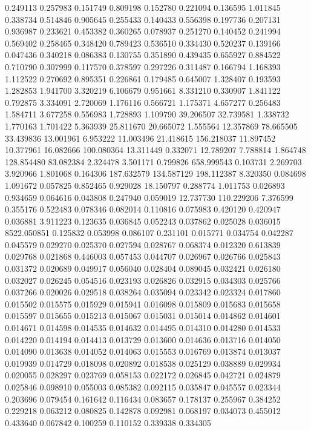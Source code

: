 0.249113
0.257983
0.151749
0.809198
0.152780
0.221094
0.136595
1.011845
0.338734
0.514846
0.905645
0.255433
0.140433
0.556398
0.197736
0.207131
0.936987
0.233621
0.453382
0.360265
0.078937
0.251270
0.140452
0.241994
0.569402
0.258465
0.348420
0.789423
0.536510
0.334430
0.520237
0.139166
0.047436
0.340218
0.086383
0.130755
0.351890
0.439435
0.655927
0.884522
0.710790
0.307999
0.117570
0.378597
0.297226
0.311487
0.166794
1.168393
1.112522
0.270692
0.895351
0.226861
0.179485
0.645007
1.328407
0.193593
1.282853
1.941700
3.320219
6.106679
0.951661
8.331210
0.330907
1.841122
0.792875
3.334091
2.720069
1.176116
0.566721
1.175371
4.657277
0.256483
1.584711
3.677258
0.556983
1.728893
1.109790
39.206507
32.739581
1.338732
1.770163
1.701422
5.363939
25.811670
20.665072
1.555564
12.357869
78.665505
33.439836
13.001961
6.953222
11.003496
21.418615
156.218037
11.897452
10.377961
16.082666
100.080364
13.311449
0.332071
12.789207
7.788814
1.864748
128.854480
83.082384
2.324478
3.501171
0.799826
658.999543
0.103731
2.269703
3.920966
1.801068
0.164306
187.632579
134.587129
198.112387
8.320350
0.084698
1.091672
0.057825
0.852465
0.929028
18.150797
0.288774
1.011753
0.026893
0.934659
0.064616
0.043808
0.247940
0.059019
12.737730
110.229206
7.376599
0.355176
0.522483
0.078346
0.082014
0.110816
0.075983
0.420120
0.420947
0.036881
3.911223
0.123635
0.036845
0.052243
0.037862
0.025028
0.036015
8522.050851
0.125832
0.053998
0.086107
0.231101
0.015771
0.034754
0.042287
0.045579
0.029270
0.025370
0.027594
0.028767
0.068374
0.012320
0.613839
0.029768
0.021868
0.446003
0.057453
0.044707
0.026967
0.026766
0.025843
0.031372
0.020689
0.049917
0.056040
0.028404
0.089045
0.032421
0.026180
0.032027
0.026245
0.054516
0.023193
0.026826
0.032915
0.034303
0.025766
0.037266
0.020026
0.029518
0.038264
0.035094
0.023342
0.023324
0.017860
0.015502
0.015575
0.015929
0.015941
0.016098
0.015809
0.015683
0.015658
0.015597
0.015655
0.015213
0.015067
0.015031
0.015014
0.014862
0.014601
0.014671
0.014598
0.014535
0.014632
0.014495
0.014310
0.014280
0.014533
0.014220
0.014194
0.014413
0.013729
0.013600
0.014636
0.013716
0.014050
0.014090
0.013638
0.014052
0.014063
0.015553
0.016769
0.013874
0.013037
0.019939
0.014729
0.018098
0.020892
0.018538
0.025129
0.038889
0.029934
0.020055
0.028297
0.023769
0.058153
0.022172
0.026845
0.042721
0.024879
0.025846
0.098910
0.055003
0.085382
0.092115
0.035847
0.045557
0.023344
0.203696
0.079454
0.161642
0.116434
0.083657
0.178137
0.255967
0.384252
0.229218
0.063212
0.080825
0.142878
0.092981
0.068197
0.034073
0.455012
0.433640
0.067842
0.100259
0.110152
0.339338
0.334305
